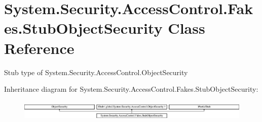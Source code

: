 \hypertarget{class_system_1_1_security_1_1_access_control_1_1_fakes_1_1_stub_object_security}{\section{System.\-Security.\-Access\-Control.\-Fakes.\-Stub\-Object\-Security Class Reference}
\label{class_system_1_1_security_1_1_access_control_1_1_fakes_1_1_stub_object_security}
}


Stub type of System.\-Security.\-Access\-Control.\-Object\-Security 


Inheritance diagram for System.\-Security.\-Access\-Control.\-Fakes.\-Stub\-Object\-Security\-:\begin{figure}[H]
\begin{center}
\leavevmode
\includegraphics[height=0.992908cm]{class_system_1_1_security_1_1_access_control_1_1_fakes_1_1_stub_object_security}
\end{center}
\end{figure}
